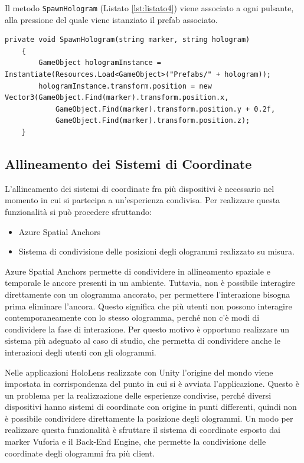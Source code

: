 Il metodo \texttt{SpawnHologram} (Listato \ref{lst:listato4}) viene associato a ogni pulsante, alla pressione del quale viene istanziato il prefab associato.

\lstset{language=[Sharp]C, numbers=left}
\begin{lstlisting}[caption={Listener richiamato per generare l'ologramma associato al marker.}, label=lst:listato4]
    private void SpawnHologram(string marker, string hologram)
    {
        GameObject hologramInstance = Instantiate(Resources.Load<GameObject>("Prefabs/" + hologram));
        hologramInstance.transform.position = new Vector3(GameObject.Find(marker).transform.position.x,
            GameObject.Find(marker).transform.position.y + 0.2f,
            GameObject.Find(marker).transform.position.z);
    }
\end{lstlisting}

\subsection{Allineamento dei Sistemi di Coordinate}
L'allineamento dei sistemi di coordinate fra più dispositivi è necessario nel momento in cui si partecipa a un'esperienza condivisa.
Per realizzare questa funzionalità si può procedere sfruttando:
\begin{itemize}
    \item Azure Spatial Anchors
    \item Sistema di condivisione delle posizioni degli ologrammi realizzato su misura.
\end{itemize}

Azure Spatial Anchors permette di condividere in allineamento spaziale e temporale le ancore presenti in un ambiente. Tuttavia, non è possibile interagire direttamente con un ologramma ancorato, per permettere l'interazione bisogna prima eliminare l'ancora.
Questo significa che più utenti non possono interagire contemporaneamente con lo stesso ologramma, perché non c'è modi di condividere la fase di interazione.
Per questo motivo è opportuno realizzare un sistema più adeguato al caso di studio, che permetta di condividere anche le interazioni degli utenti con gli ologrammi.

Nelle applicazioni HoloLens realizzate con Unity l'origine del mondo viene impostata in corrispondenza del punto in cui si è avviata l'applicazione.
Questo è un problema per la realizzazione delle esperienze condivise, perché diversi dispositivi hanno sistemi di coordinate con origine in punti differenti, quindi non è possibile condividere direttamente la posizione degli ologrammi.
Un modo per realizzare questa funzionalità è sfruttare il sistema di coordinate esposto dai marker Vuforia e il Back-End Engine, che permette la condivisione delle coordinate degli ologrammi fra più client.


